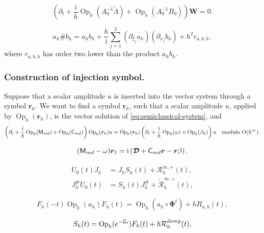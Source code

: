 \documentclass[10pt,a4paper]{amsart}
\newcommand{\Op}{\operatorname{Op}}
\newcommand{\ii}{\mathrm{i}}
\begin{document}
\begin{equation}\label{eq:semiclassical-system}
    \left(\partial_t+\frac{\ii}{h}\Op_h(A_0^{-1}\widetilde\Lambda)+\Op_h(A_0^{-1}B_0)\right)\bm W=0.
\end{equation}

\begin{equation}\label{eq:symbol-product}
    a_h\# b_h = a_hb_h+\frac{h}{\ii}\sum_{j=1}^2(\partial_{\xi_j}a_h)(\partial_{x_j}b_h)+h^2r_{a,b,h},
\end{equation}
where $r_{a,b,h}$ has order two lower than the product $a_hb_h$.

\subsubsection{Construction of injection symbol.}\label{sec:injection-symbol}
Suppose that a scalar amplitude $u$ is inserted into the vector system through a symbol $\bm r_h$. We want to find a symbol $\bm r_h$, such that a scalar amplitude $u$, applied by $\Op_h(\bm{r}_h)$, is the vector solution of \eqref{eq:semiclassical-system}, and 
\begin{equation}\label{eq:intertwine}
\left(\partial_t+\frac{\ii}{h}\Op_h(\mathsf M_{\rm md})+\Op_h(\mathsf C_{\rm md})\right)\Op_h(\bm r_h)u=\Op_h(\bm r_h)\left(\partial_t+\frac{\ii}{h}\Op_h(\omega)+\Op_h(\beta_h)\right)u \quad\text{modulo }O(h^\infty).
\end{equation}

\begin{equation}\label{eq:first-right-correction}
    (\mathsf M_{\rm md}-\omega)\bm r_1 = \ii\left(\bm{\mathcal D}+\mathsf C_{\rm md}\bm r-\bm r\beta\right).
\end{equation}

\begin{align}
    U_0(t)J_h&=J_hS_h(t)+\mathcal R_h^{\infty,+}(t),
    \label{eq:intertwining-operator-remainder}\\
    J_h^{\#}U_0(t)&=S_h(t)J_h^{\#}+\widetilde{\mathcal R}_h^{\infty,+}(t),
    \label{eq:left-intertwining-operator-remainder}
\end{align}

\begin{equation}\label{eq:egorov-with-class}
    F_h(-t)\Op_h(a_h)F_h(t)=\Op_h(a_h\circ\bm\Phi^t)+hR_{a,h}(t),
\end{equation}

\begin{equation}\label{eq:damped-factorization}
    S_h(t)=\Op_h(e^{-\mathcal G_t})F_h(t)+h\mathcal R_h^{\rm damp}(t),
\end{equation}
\end{document}
